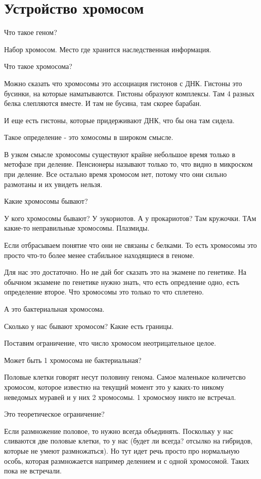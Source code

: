 ﻿\section{Устройство хромосом}

Что такое геном? 

Набор хромосом. Место где хранится наследственная информация. 

Что такое хромосома? 

Можно сказать что хромосомы это ассоциация гистонов с ДНК. 
Гистоны это бусинки, на которые наматываются. Гистоны образуют комплексы. 
Там 4 разных белка слепляются вместе. И там не бусина, там скорее барабан. 

И еще есть гистоны, которые придерживают ДНК, что бы она там сидела. 

Такое определение - это хомосомы в широком смысле. 

В узком смысле хромосомы существуют крайне небольшое время только 
в метофазе при деление. Пенсионеры называют только то, что 
видно в микроском при деление. Все остально время хромосом нет, 
потому что они сильно размотаны и их увидеть нельзя. 

Какие хромосомы бывают? 

У кого хромосомы бывают? 
У эукориотов. А у прокариотов? Там кружочки. ТАм какие-то 
неправильные хромосомы. Плазмиды. 

Если отбрасываем понятие что они не связаны с белками. То есть
хромосомы это просто что-то более менее стабильное находящиеся в
геноме.

Для нас это достаточно. Но не дай бог сказать это на экамене по
генетике. На обычном экзамене по генетике нужно знать,
что есть опредление одно, есть определение второе. Что
хромосомы это только то что сплетено.

А это бактериальная хромосома.

Сколько у нас бывают хромосом? Какие есть границы.

Поставим ограничение, что число хромосом неотрицательное целое.

Может быть 1 хромосома не бактериальная?

Половые клетки говорят несут половину генома. Самое маленькое количетсво 
хромосом, которое известно на текущий момент 
это у каких-то никому неведомых муравей и у них 2 хромосомы. 1 хромосмоу
никто не встречал. 

Это теоретическое ограничение? 

Если размножение половое, то нужно всегда объединять. Поскольку у нас 
сливаются две половые клетки, то у нас (будет ли всегда? отсылко на гибридов, которые не умеют 
размножаться). Но тут идет речь просто про нормальную особь, которая размножается например делением 
и с одной хромосомой. Таких пока не встречали. 

